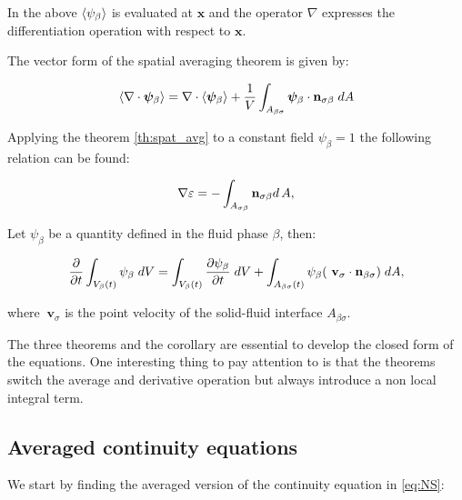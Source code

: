 In the above ${\left< \psi_{\beta} \right>}$ is evaluated at $\mathbf{x}$ and the operator $\nabla$ expresses the differentiation operation with respect to $\mathbf{x}$.

\begin{corollary}
	The vector form of the spatial averaging theorem is given by:
	
	\begin{equation}
	{\left< \nabla \cdot \boldsymbol{\psi}_{\beta} \right>} = \nabla \cdot {\left<  \boldsymbol{\psi}_{\beta} \right>} + \dfrac{1}{V} \int_{A_{\beta \sigma}}  \boldsymbol{\psi}_{\beta} \cdot \mathbf{n}_{\sigma \beta} \;dA
			\label{th:vec_spat_avg}
	\end{equation}
\end{corollary}

\begin{corollary}
	Applying the theorem \eqref{th:spat_avg} to a constant field $\psi_{\beta} = 1$ the following relation can be found:
	
	\begin{equation}
		\nabla \varepsilon = - \int_{A_{\sigma \beta}} \mathbf{n}_{\sigma \beta} d \, A,
	\end{equation}
\end{corollary}

\newpage

\begin{theorem}
	Let $\psi_{\beta}$ be a quantity defined in the fluid phase $\beta$, then:
	
	\begin{equation}
	\dfrac{\partial}{\partial t} \int_{V_\beta(t)} \psi_{\beta} \; dV =  \int_{V_\beta(t)} \dfrac{\partial \psi_{\beta}}{\partial t} \; dV + \int_{A_{\beta \sigma}(t)} \psi_{\beta} ( \mathbf{\ v}_{\sigma} \cdot \mathbf{n}_{\beta \sigma} ) \;dA,
	\label{th:transport}
	\end{equation}
	
	\noindent where $\mathbf{\ v}_{\sigma}$ is the point velocity of the solid-fluid interface $A_{\beta \sigma}$.
\end{theorem}

The three theorems and the corollary are essential to develop the closed form of the equations.
One interesting thing to pay attention to is that the theorems switch the average and derivative operation but always introduce a non local integral term.

\subsection{Averaged continuity equations}
We start by finding the averaged version of the continuity equation in \eqref{eq:NS}:

